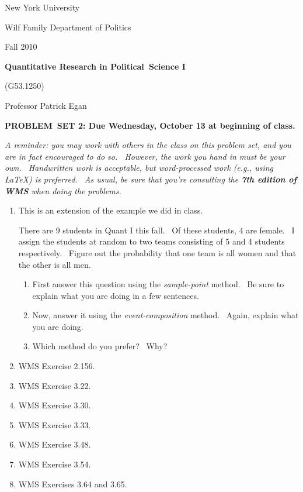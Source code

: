 \documentclass[11pt]{article}
\begin{document}
New York University

Wilf Family Department of Politics

Fall 2010

\begin{center}
{\large \textbf{Quantitative Research in Political\ Science I}}

(G53.1250)

Professor Patrick Egan

\bigskip

\textbf{PROBLEM\ SET 2: Due Wednesday, October 13 at beginning of class.}
\end{center}

\textit{A reminder: you may work with others in the class on this problem
set, and you are in fact encouraged to do so. \ However, the work you hand
in must be your own. \ Handwritten work is acceptable, but word-processed
work (e.g., using LaTeX) is preferred. \ As usual, be sure that you're
consulting the \textbf{7th edition of WMS }when doing the problems.}

\bigskip

\begin{enumerate}
\item This is an extension of the example we did in class. \ 

There are 9 students in Quant I this fall. \ Of these students, 4 are
female. \ I assign the students at random to two teams consisting of 5 and 4
students respectively. \ Figure out the probability that one team is all
women and that the other is all men.

\begin{enumerate}
\item First answer this question using the \textit{sample-point }method. \
Be sure to explain what you are doing in a few sentences.\ 

\item Now, answer it using the \textit{event-composition} method. \ Again,
explain what you are doing.

\item Which method do you prefer? \ Why?
\end{enumerate}

\item WMS Exercise 2.156.

\item WMS Exercise 3.22.

\item WMS Exercise 3.30.

\item WMS Exercise 3.33.

\item WMS Exercise 3.48.

\item WMS Exercise 3.54.

\item WMS Exercises 3.64 and 3.65.
\end{enumerate}
\end{document}
